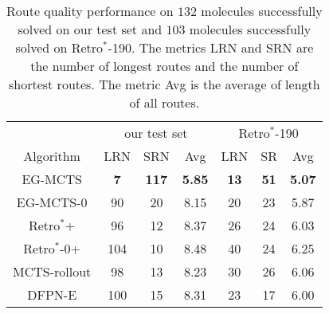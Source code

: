 \documentclass[sn-mathphys,Numbered]{sn-jnl}
\begin{document}
\begin{table}[!ht]
\begin{tabular}{ccccccccc}
  \end{tabular}

\end{table}



\begin{table}[!ht]
    \caption{Route quality performance on $132$ molecules successfully solved on our test set and $103$ molecules successfully solved on Retro$^*$-190. The metrics LRN and SRN are the number of longest routes and the number of shortest routes. The metric Avg is the average of length of all routes.}
    \centering
    \begin{tabular}{ccccccc}
            \toprule
            & \multicolumn{3}{c}{our test set}     & \multicolumn{3}{c}{Retro$^*$-190}             \\
            \cmidrule(r){2-4} \cmidrule(r){5-7} 
            Algorithm   & LRN   & SRN & Avg & LRN   & SR & Avg\\

            \midrule
            EG-MCTS     & \textbf{7}       & \textbf{117}    & \textbf{5.85} & \textbf{13}       & \textbf{51}    & \textbf{5.07}\\
            EG-MCTS-0   & 90        & 20   & 8.15  & 20        & 23   & 5.87\\
            Retro$^*$+      & 96        & 12   & 8.37   & 26        & 24   & 6.03\\
            Retro$^*$-0+    & 104        & 10   & 8.48   & 40        & 24   & 6.25\\
            MCTS-rollout      & 98        & 13   & 8.23  & 30       & 26   & 6.06\\
            DFPN-E      & 100        & 15   & 8.31  & 23        & 17   & 6.00   \\
            
            \bottomrule
        \end{tabular}

        \label{table-quality}
\end{table}
\end{document}
